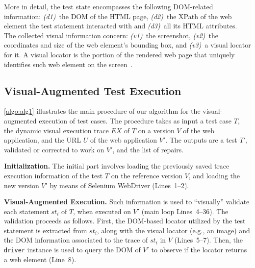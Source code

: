 
More in detail, the test state encompasses the following DOM-related information: \textit{(d1)}~the DOM of the HTML page, \textit{(d2)}~the XPath of the web element the test statement interacted with and \textit{(d3)}~all its HTML attributes. The collected visual information concern: \textit{(v1)}~the screenshot, \textit{(v2)}~the coordinates and size of the web element's bounding box, and \textit{(v3)}~a visual locator for it. A visual locator is the portion of the rendered web page that uniquely identifies such web element on the screen~\cite{2015-Leotta-SAC}. 
%

\subsection{Visual-Augmented Test Execution}

\autoref{algo:alg1} illustrates the main procedure of our algorithm for the visual-augmented execution of test cases. The procedure takes as input a test case $T$, 
the dynamic visual execution trace $EX$ of $T$ on a version $V$ of the web application, and the URL $U$ of the web application $V'$. The outputs are a test $T'$, validated or corrected to work on $V'$, and the list of repairs. 

\noindent
\textbf{Initialization.} 
The initial part involves loading the previously saved trace execution information of the test $T$ on the reference version $V$, and loading the new version $V'$ by means of Selenium WebDriver (Lines~1--2). 

\noindent
\textbf{Visual-Augmented Execution.}
Such information is used to ``visually'' validate each statement $st_i$ of $T$, when executed on $V'$ (main loop Lines~4--36). The validation proceeds as follows. First, the DOM-based locator utilized by the test statement is extracted from $st_i$, along with the visual locator (e.g., an image) and the DOM information associated to the trace of $st_i$ in $V$  (Lines~5--7). Then, the \texttt{driver} instance is used to query the DOM of $V'$ to observe if the locator returns a web element (Line~8). 


